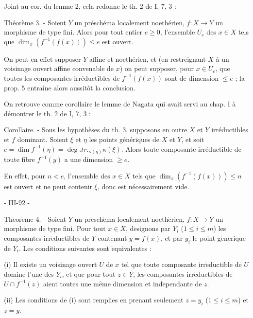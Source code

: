 Joint au cor. du lemme 2, cela redonne le th. 2 de I, 7, 3 :

Théorème 3. - Soient $Y$ un préschéma localement noethérien, $f : X \to Y$ un morphisme de type fini. Alors pour tout entier $e \ge 0$, l'ensemble $U_e$ des $x \in X$ tels que $\dim_x(f^{-1}(f(x))) \le e$ est ouvert.

On peut en effet supposer $Y$ affine et noethérien, et (en restreignant $X$ à un voisinage ouvert affine convenable de $x$) on peut supposer, pour $x \in U_e$, que toutes les composantes irréductibles de $f^{-1}(f(x))$ sont de dimension $\le e$ ; la prop. 5 entraîne alors aussitôt la conclusion.

On retrouve comme corollaire le lemme de Nagata qui avait servi au chap. I à démontrer le th. 2 de I, 7, 3 :

Corollaire. - Sous les hypothèses du th. 3, supposons en outre $X$ et $Y$ irréductibles et $f$ dominant. Soient $\xi$ et $\eta$ les points génériques de $X$ et $Y$, et soit $e = \dim f^{-1}(\eta) = \deg.tr._{\kappa(\eta)} \kappa(\xi)$. Alors toute composante irréductible de toute fibre $f^{-1}(y)$ a une dimension $\ge e$.

En effet, pour $n < e$, l'ensemble des $x \in X$ tels que $\dim_x(f^{-1}(f(x))) \le n$ est ouvert et ne peut contenir $\xi$, donc est nécessairement vide.

\newpage


- III-92 -

\noindent Th\(\acute{\text{e}}\)or\(\grave{\text{e}}\)me 4. - Soient \(Y\) un pr\(\acute{\text{e}}\)sch\(\acute{\text{e}}\)ma localement noeth\(\acute{\text{e}}\)rien, \(f: X \to Y\) un morphisme de type fini. Pour tout \(x \in X\), d\(\acute{\text{e}}\)signons par \(Y_i\) (\(1 \le i \le m\)) les composantes irr\(\acute{\text{e}}\)ductibles de \(Y\) contenant \(y=f(x)\), et par \(y_i\) le point g\(\acute{\text{e}}\)n\(\acute{\text{e}}\)rique de \(Y_i\). Les conditions suivantes sont \(\acute{\text{e}}\)quivalentes :

(i) Il existe un voisinage ouvert \(U\) de \(x\) tel que toute composante irr\(\acute{\text{e}}\)ductible de \(U\) domine l'une des \(Y_i\), et que pour tout \(z \in Y\), les composantes irr\(\acute{\text{e}}\)ductibles de \(U \cap f^{-1}(z)\) aient toutes une m\(\hat{\text{e}}\)me dimension et ind\(\acute{\text{e}}\)pendante de \(z\).

(ii) Les conditions de (i) sont remplies en prenant seulement \(z=y_i\) (\(1 \le i \le m\)) et \(z=y\).

